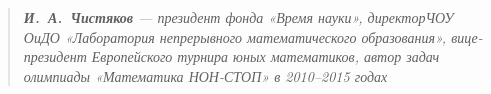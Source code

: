 \begin{quote}
\itshape {\bfseries И.~А.~Чистяков} — президент фонда «Время науки», директор\linebreak ЧОУ ОиДО «Лаборатория непрерывного математического образования», вице-президент Европейского турнира юных математиков, автор задач олимпиады «Математика НОН-СТОП» в 2010–2015 годах
\end{quote}